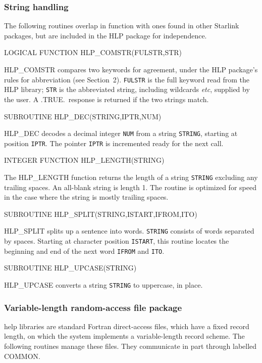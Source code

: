 \documentclass[11pt,nolof]{starlink}
\begin{document}
\subsubsection{String handling}
The following routines overlap in function with ones found
in other Starlink packages, but are included in the HLP package for
independence.

\begin{terminalv}
LOGICAL FUNCTION HLP_COMSTR(FULSTR,STR)
\end{terminalv}
HLP\_COMSTR compares two keywords for agreement, under the HLP
package's rules for abbreviation (see Section~2).  \texttt{FULSTR}
is the full keyword read from the HLP library; \texttt{STR} is
the abbreviated string, including wildcards \textit{etc}, supplied
by the user.  A .TRUE.\, response is returned if the
two strings match.

\begin{terminalv}
SUBROUTINE HLP_DEC(STRING,IPTR,NUM)
\end{terminalv}
HLP\_DEC decodes a decimal integer \texttt{NUM}
from a string \texttt{STRING}, starting at position \texttt{IPTR}.
The pointer \texttt{IPTR} is incremented ready for the next call.

\begin{terminalv}
INTEGER FUNCTION HLP_LENGTH(STRING)
\end{terminalv}
The HLP\_LENGTH function returns the
length of a string \texttt{STRING} excluding any
trailing spaces.  An all-blank string is length 1.  The routine is
optimized for speed in the case where the string is mostly trailing
spaces.

\begin{terminalv}
SUBROUTINE HLP_SPLIT(STRING,ISTART,IFROM,ITO)
\end{terminalv}
HLP\_SPLIT splits up a sentence into words.
\texttt{STRING} consists of words separated by spaces.  Starting
at character position \texttt{ISTART}, this routine locates the
beginning and end of the next word \texttt{IFROM} and \texttt{ITO}.

\begin{terminalv}
SUBROUTINE HLP_UPCASE(STRING)
\end{terminalv}
HLP\_UPCASE converts a string \texttt{STRING} to uppercase, in place.

\subsubsection{Variable-length random-access file package}
help libraries are standard Fortran direct-access files, which have
a fixed record length, on which the system implements a
variable-length record scheme.  The following routines manage
these files.  They communicate in part through labelled
COMMON.
\end{document}
